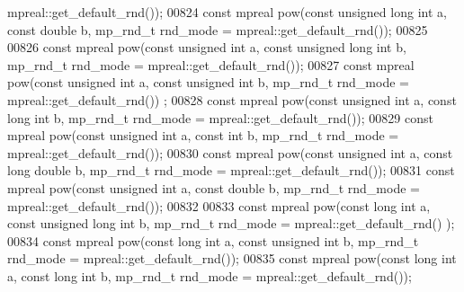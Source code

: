 \begin{DoxyCode}
      mpreal::get\_default\_rnd());
00824 \textcolor{keyword}{const} mpreal pow(\textcolor{keyword}{const} \textcolor{keywordtype}{unsigned} \textcolor{keywordtype}{long} \textcolor{keywordtype}{int} a, \textcolor{keyword}{const} \textcolor{keywordtype}{double} b, mp\_rnd\_t rnd\_mode = mpreal::get\_default\_rnd());
00825 
00826 \textcolor{keyword}{const} mpreal pow(\textcolor{keyword}{const} \textcolor{keywordtype}{unsigned} \textcolor{keywordtype}{int} a, \textcolor{keyword}{const} \textcolor{keywordtype}{unsigned} \textcolor{keywordtype}{long} \textcolor{keywordtype}{int} b, mp\_rnd\_t rnd\_mode = 
      mpreal::get\_default\_rnd());
00827 \textcolor{keyword}{const} mpreal pow(\textcolor{keyword}{const} \textcolor{keywordtype}{unsigned} \textcolor{keywordtype}{int} a, \textcolor{keyword}{const} \textcolor{keywordtype}{unsigned} \textcolor{keywordtype}{int} b, mp\_rnd\_t rnd\_mode = mpreal::get\_default\_rnd())
      ;
00828 \textcolor{keyword}{const} mpreal pow(\textcolor{keyword}{const} \textcolor{keywordtype}{unsigned} \textcolor{keywordtype}{int} a, \textcolor{keyword}{const} \textcolor{keywordtype}{long} \textcolor{keywordtype}{int} b, mp\_rnd\_t rnd\_mode = mpreal::get\_default\_rnd());
00829 \textcolor{keyword}{const} mpreal pow(\textcolor{keyword}{const} \textcolor{keywordtype}{unsigned} \textcolor{keywordtype}{int} a, \textcolor{keyword}{const} \textcolor{keywordtype}{int} b, mp\_rnd\_t rnd\_mode = mpreal::get\_default\_rnd());
00830 \textcolor{keyword}{const} mpreal pow(\textcolor{keyword}{const} \textcolor{keywordtype}{unsigned} \textcolor{keywordtype}{int} a, \textcolor{keyword}{const} \textcolor{keywordtype}{long} \textcolor{keywordtype}{double} b, mp\_rnd\_t rnd\_mode = mpreal::get\_default\_rnd());
00831 \textcolor{keyword}{const} mpreal pow(\textcolor{keyword}{const} \textcolor{keywordtype}{unsigned} \textcolor{keywordtype}{int} a, \textcolor{keyword}{const} \textcolor{keywordtype}{double} b, mp\_rnd\_t rnd\_mode = mpreal::get\_default\_rnd());
00832 
00833 \textcolor{keyword}{const} mpreal pow(\textcolor{keyword}{const} \textcolor{keywordtype}{long} \textcolor{keywordtype}{int} a, \textcolor{keyword}{const} \textcolor{keywordtype}{unsigned} \textcolor{keywordtype}{long} \textcolor{keywordtype}{int} b, mp\_rnd\_t rnd\_mode = mpreal::get\_default\_rnd()
      );
00834 \textcolor{keyword}{const} mpreal pow(\textcolor{keyword}{const} \textcolor{keywordtype}{long} \textcolor{keywordtype}{int} a, \textcolor{keyword}{const} \textcolor{keywordtype}{unsigned} \textcolor{keywordtype}{int} b, mp\_rnd\_t rnd\_mode = mpreal::get\_default\_rnd());
00835 \textcolor{keyword}{const} mpreal pow(\textcolor{keyword}{const} \textcolor{keywordtype}{long} \textcolor{keywordtype}{int} a, \textcolor{keyword}{const} \textcolor{keywordtype}{long} \textcolor{keywordtype}{int} b, mp\_rnd\_t rnd\_mode = mpreal::get\_default\_rnd());

\end{DoxyCode}
